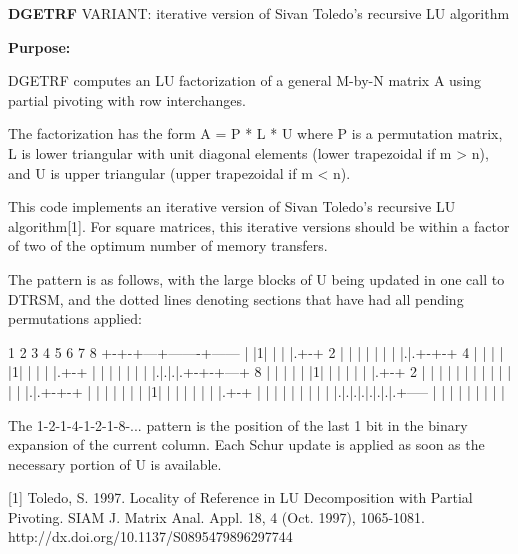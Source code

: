 {\bfseries D\+G\+E\+T\+R\+F} V\+A\+R\+I\+A\+N\+T\+: iterative version of Sivan Toledo's recursive L\+U algorithm 

{\bfseries Purpose\+:} \begin{DoxyVerb} DGETRF computes an LU factorization of a general M-by-N matrix A
 using partial pivoting with row interchanges.

 The factorization has the form
    A = P * L * U
 where P is a permutation matrix, L is lower triangular with unit
 diagonal elements (lower trapezoidal if m > n), and U is upper
 triangular (upper trapezoidal if m < n).

 This code implements an iterative version of Sivan Toledo's recursive
 LU algorithm[1].  For square matrices, this iterative versions should
 be within a factor of two of the optimum number of memory transfers.

 The pattern is as follows, with the large blocks of U being updated
 in one call to DTRSM, and the dotted lines denoting sections that
 have had all pending permutations applied:

  1 2 3 4 5 6 7 8
 +-+-+---+-------+------
 | |1|   |       |
 |.+-+ 2 |       |
 | | |   |       |
 |.|.+-+-+   4   |
 | | | |1|       |
 | | |.+-+       |
 | | | | |       |
 |.|.|.|.+-+-+---+  8
 | | | | | |1|   |
 | | | | |.+-+ 2 |
 | | | | | | |   |
 | | | | |.|.+-+-+
 | | | | | | | |1|
 | | | | | | |.+-+
 | | | | | | | | |
 |.|.|.|.|.|.|.|.+-----
 | | | | | | | | |

 The 1-2-1-4-1-2-1-8-... pattern is the position of the last 1 bit in
 the binary expansion of the current column.  Each Schur update is
 applied as soon as the necessary portion of U is available.

 [1] Toledo, S. 1997. Locality of Reference in LU Decomposition with
 Partial Pivoting. SIAM J. Matrix Anal. Appl. 18, 4 (Oct. 1997),
 1065-1081. http://dx.doi.org/10.1137/S0895479896297744\end{DoxyVerb}
 
